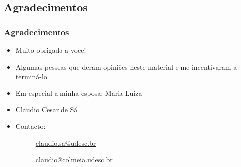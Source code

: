 \subsection{Agradecimentos}
\begin{frame}[fragile]

    \frametitle{Agradecimentos}

    \begin{itemize}
      \item Muito obrigado a voce!
      \pause
      \item Algumas pessoas que deram opiniões neste material 
            e me incentivaram a terminá-lo 
            
      \pause
      \item  Em especial a minha esposa: Maria Luiza
  
      \pause
      \item Claudio Cesar de Sá
     \item Contacto: 
     \begin{description}
          \item[\Letter \/] \url{claudio.sa@udesc.br}
          \item[\Letter \/] \url{claudio@colmeia.udesc.br}
     \end{description}


    \end{itemize}
\end{frame}



